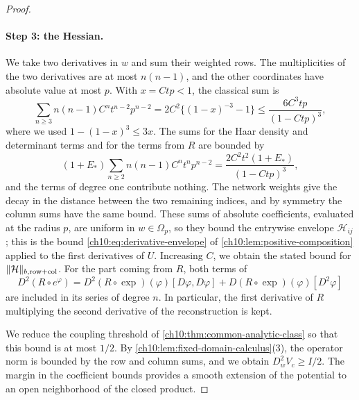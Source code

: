 \begin{proof}
\paragraph{Step 3: the Hessian.}
We take two derivatives in $w$ and sum their weighted rows. The multiplicities of the two derivatives are at most $n(n-1)$, and the other coordinates have absolute value at most $p$. With $x=Ctp<1$, the classical sum is
\[
 \sum_{n\ge3}n(n-1)C^nt^{n-2}p^{n-2}=2C^2\bigl\{(1-x)^{-3}-1\bigr\}\le\frac{6C^3tp}{(1-Ctp)^3},
\]
where we used $1-(1-x)^3\le3x$. The sums for the Haar density and determinant terms and for the terms from $R$ are bounded by
\[
 (1+E_*)\sum_{n\ge2}n(n-1)C^nt^np^{n-2}=\frac{2C^2t^2(1+E_*)}{(1-Ctp)^3},
\]
and the terms of degree one contribute nothing. The network weights give the decay in the distance between the two remaining indices, and by symmetry the column sums have the same bound. These sums of absolute coefficients, evaluated at the radius $p$, are uniform in $w\in\Omega_p$, so they bound the entrywise envelope $\mathcal H_{ij}$; this is the bound \eqref{ch10:eq:derivative-envelope} of \cref{ch10:lem:positive-composition} applied to the first derivatives of $U$. Increasing $C$, we obtain the stated bound for $\lVert \mathcal H\rVert_{b,\mathrm{row+col}}$. For the part coming from $R$, both terms of
\[
 D^2(R\circ e^{\varphi})=D^2(R\circ\exp)(\varphi)[D\varphi,D\varphi]+D(R\circ\exp)(\varphi)[D^2\varphi]
\]
are included in its series of degree $n$. In particular, the first derivative of $R$ multiplying the second derivative of the reconstruction is kept.

We reduce the coupling threshold of \cref{ch10:thm:common-analytic-class} so that this bound is at most $1/2$. By \cref{ch10:lem:fixed-domain-calculus}(3), the operator norm is bounded by the row and column sums, and we obtain $D_w^2V_c\ge I/2$. The margin in the coefficient bounds provides a smooth extension of the potential to an open neighborhood of the closed product.


\end{proof}
